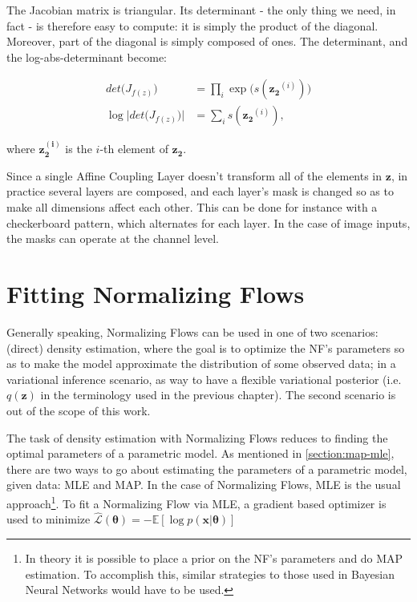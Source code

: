 The Jacobian matrix is triangular. Its determinant - the only thing we need,
in fact - is therefore easy to compute: it is simply the product of the diagonal.
Moreover, part of the diagonal is simply composed of ones. The determinant, and
the log-abs-determinant become:

\begin{align}
    det\big(J_{f(z)}\big) &= \prod_i \exp\big(s(\bm{z_2}^{(i)})\big) \\
    \log \Big|det\big(J_{f(z)}\big)\Big| &= \sum_i s(\bm{z_2}^{(i)}),
\end{align}

where $\bm{z_2^{(i)}}$ is the $i$-th element of $\bm{z_2}$.

Since a single Affine Coupling Layer doesn't transform all of the elements in
$\bm{z}$, in practice several layers are composed, and each layer's mask is changed
so as to make all dimensions affect each other. This can be done for instance with
a checkerboard pattern, which alternates for each layer. In the case of image inputs,
the masks can operate at the channel level.

\section{Fitting Normalizing Flows}

Generally speaking, Normalizing Flows can be used in one of two scenarios:
(direct) density estimation, where the goal is to optimize the NF's parameters
so as to make the model approximate the distribution of some observed data;
in a variational inference scenario, as way to have a flexible variational
posterior (i.e. $q(\bm{z})$ in the terminology used in the previous chapter). The
second scenario is out of the scope of this work.

The task of density estimation with Normalizing Flows reduces to finding the
optimal parameters of a parametric model. As mentioned in \ref{section:map-mle},
there are two ways to go about estimating the parameters of a parametric model,
given data: MLE and MAP. In the case of Normalizing Flows, MLE is the usual
approach\footnote{In theory it is possible to place a prior on the NF's parameters
and do MAP estimation. To accomplish this, similar strategies to those used in
Bayesian Neural Networks would have to be used.}. To fit a Normalizing Flow via
MLE, a gradient based optimizer is used to minimize
$\hat{\mathcal{L}}(\bm\theta) = - \mathbb{E}[\log p(\bm{x}|\bm\theta)]$
